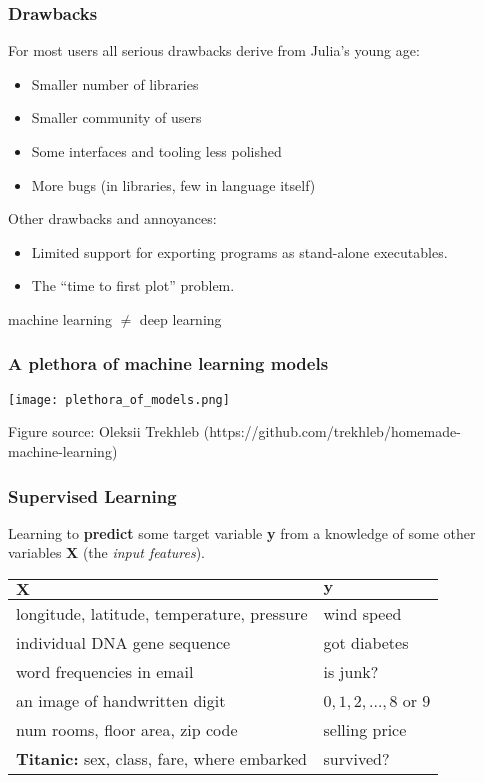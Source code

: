 \documentclass[t]{beamer}
\newcommand\df{\bf\color{Maroon}}
\begin{document}
\begin{frame}
  \frametitle{Drawbacks}
  For most users all serious drawbacks derive from Julia's young age:
  \begin{itemize}
     \item Smaller number of libraries
     \item Smaller community of users
     \item Some interfaces and tooling less polished
     \item More bugs (in libraries, few in language itself)
  \end{itemize}
  Other drawbacks and annoyances:
  \begin{itemize}
     \item Limited support for exporting programs as stand-alone executables.
     \item The ``time to first plot'' problem.
  \end{itemize}
\end{frame}



\begin{frame}
  \vspace{5\baselineskip}
  \begin{center}
  {\Large machine learning $\ne$ deep learning\\
  \mbox{}\hspace{4cm} }
  \end{center}
\end{frame}

\begin{frame}
  \frametitle{A plethora of machine learning models}
  \begin{center}
    \texttt{[image: plethora\_of\_models.png]}
  \end{center}
  {\tiny Figure source: Oleksii Trekhleb ({\ttfamily https://github.com/trekhleb/homemade-machine-learning})}
\end{frame}

\begin{frame}
  \frametitle{Supervised Learning}
  Learning to {\df predict} some target variable {\df\large y} from a
  knowledge of some other variables {\df \large X} (the {\it input features}).\pause
  \begin{table}
  \begin{tabular}{|l|l|}
    \hline
    ${\mathbf X}$  & ${\mathbf y}$ \\ \hline
    longitude, latitude, temperature, pressure & wind speed \\
    individual DNA gene sequence & got diabetes\\
    word frequencies in email & is junk? \\
    an image of handwritten digit & $0, 1, 2, \ldots, 8$ or $9$ \\
    num rooms, floor area, zip code & selling price \\
    {\bf Titanic:} sex, class, fare, where embarked & survived? \\
    \hline
  \end{tabular}
  \end{table}
\end{frame}
\end{document}
